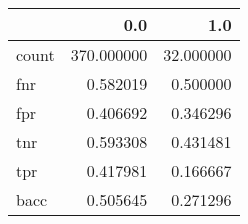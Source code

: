 \begin{tabular}{lrr}
\toprule
{} &         0.0 &        1.0 \\
\midrule
count &  370.000000 &  32.000000 \\
fnr   &    0.582019 &   0.500000 \\
fpr   &    0.406692 &   0.346296 \\
tnr   &    0.593308 &   0.431481 \\
tpr   &    0.417981 &   0.166667 \\
bacc  &    0.505645 &   0.271296 \\
\bottomrule
\end{tabular}
